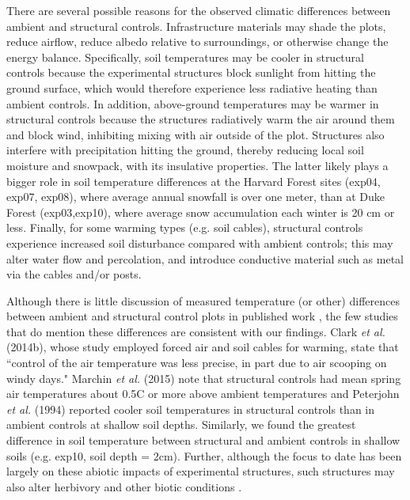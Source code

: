 \documentclass{article}
\begin{document}
\par There are several possible reasons for the observed climatic differences between ambient and structural controls. Infrastructure materials may shade the plots, reduce airflow, reduce albedo relative to surroundings, or otherwise change the energy balance. Specifically, soil temperatures may be cooler in structural controls because the experimental structures block sunlight from hitting the ground surface, which would therefore experience less radiative heating than ambient controls. In addition, above-ground temperatures may be warmer in structural controls because the structures radiatively warm the air around them and block wind, inhibiting mixing with air outside of the plot. Structures also interfere with precipitation hitting the ground, thereby reducing local soil moisture and snowpack, with its insulative properties. The latter likely plays a bigger role in soil temperature differences at the Harvard Forest sites (exp04, exp07, exp08), where average annual snowfall is over one meter, than at Duke Forest (exp03,exp10), where average snow accumulation each winter is 20 cm or less. Finally, for some warming types (e.g. soil cables), structural controls experience increased soil disturbance compared with ambient controls; this may  alter water flow and percolation, and introduce conductive material such as metal via the cables and/or posts.

\par Although there is little discussion of measured temperature (or other) differences between ambient and structural control plots in published work \citep[e.g.,][]{farnsworth1995,pelini2011,clark2014a}, the few studies that do mention these differences are consistent with our findings. Clark \textit{et al.} (2014b), whose study employed forced air and soil cables for warming, state that ``control of the air temperature was less precise, in part due to air scooping on windy days." Marchin \textit{et al.} (2015) note that structural controls had mean spring air temperatures about  0.5\degree C or more above ambient temperatures and Peterjohn \textit{et al.} (1994) reported cooler soil temperatures in structural controls than in ambient controls at shallow soil depths. Similarly, we found the greatest difference in soil temperature between structural and ambient controls in shallow soils (e.g. exp10, soil depth = 2cm). Further, although the focus to date has been largely on these abiotic impacts of experimental structures, such structures may also alter herbivory and other biotic conditions \citep{kennedy1995,moise2010,wolkovich2012,hoeppner2012}. 
\end{document}
